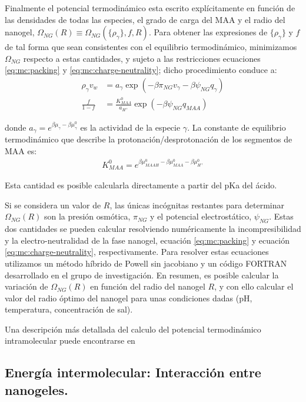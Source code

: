 	
	Finalmente el potencial termodin\'amico esta escrito expl\'icitamente en funci\'on de las densidades de todas las especies, el grado de carga del MAA y el radio del nanogel, $\Omega_{NG}(R)\equiv\Omega_{NG}(\{\rho_\gamma\},f,R)$.
	Para obtener las expresiones de $\{\rho_\gamma\}$ y $f$ de tal forma que sean consistentes con el equilibrio termodin\'amico, minimizamos $\Omega_{NG}$ respecto a estas cantidades, y  sujeto a las restricciones ecuaciones  \ref{eq:mc:packing} y  \ref{eq:mc:charge-neutrality}; dicho procedimiento conduce a: 
	\begin{align}
		\rho_\gamma v_w &= a_\gamma \exp(-\beta\pi_{NG}v_\gamma -\beta\psi_{NG}q_{\gamma})\\
		\frac{f}{1-f}&= \frac{K^0_{MAA}}{a_{H^+}}\exp(-\beta\psi_{NG}q_{MAA})\label{eq:mc:fcharge}
	\end{align}
	
	\noindent donde $a_\gamma = e^{\beta\mu_\gamma-\beta\mu_\gamma^0}$ es la actividad de la especie $\gamma$. 
	La constante de equilibrio termodin\'amico que describe la protonaci\'on/desprotonaci\'on de los segmentos de MAA es:
	\begin{align}
		K^0_{MAA}= e^{\beta\mu^0_{MAAH}-\beta\mu^0_{MAA}-\beta\mu^0_{H^+}}
	\end{align}
	
	\noindent Esta cantidad es posible calcularla directamente a partir del pKa del \'acido.
	
	
	Si se considera  un valor de  $R$, las \'unicas inc\'ognitas restantes para determinar $\Omega_{NG}(R)$ son la presi\'on osm\'otica, $\pi_{NG}$ y el potencial electrost\'atico, $\psi_{NG}$.
	Estas dos cantidades se pueden calcular resolviendo num\'ericamente la incompresibilidad y la electro-neutralidad de la fase nanogel, ecuaci\'on \ref{eq:mc:packing} y ecuaci\'on \ref{eq:mc:charge-neutrality}, respectivamente.
	Para resolver estas ecuaciones utilizamos un m\'etodo h\'ibrido de Powell sin jacobiano y un c\'odigo FORTRAN desarrollado en el grupo de investigaci\'on.
	En resumen, es posible calcular la variaci\'on de  $\Omega_{NG}(R)$ en funci\'on del radio del nanogel $R$, y con ello calcular el valor del radio \'optimo del nanogel para unas condiciones dadas (pH, temperatura, concentraci\'on de sal).
	
	Una descripci\'on m\'as detallada del calculo del potencial termodin\'amico intramolecular puede encontrarse en \cite{perez2021thermodynamic}
	
	\subsection{Energ\'ia intermolecular: Interacci\'on entre nanogeles.}\label{sec:mc:energia_intra}
	
